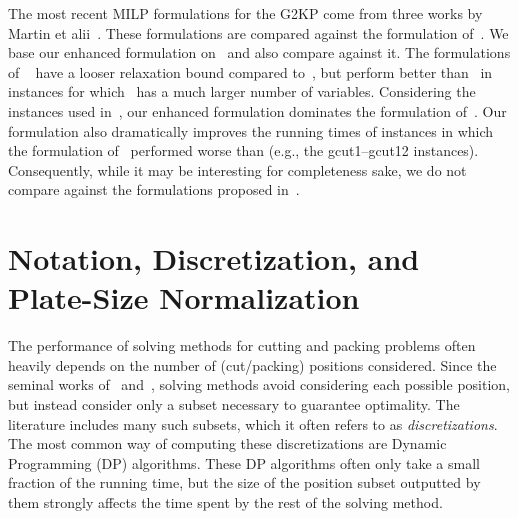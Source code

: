 \documentclass[smallextended]{svjour3}       %
\begin{document}
The most recent MILP formulations for the G2KP come from three works by Martin et alii~\cite{martin:2020:models,martin:2020:bottom,martin:2020:top}.
These formulations are compared against the formulation of~\cite{furini:2016}.
We base our enhanced formulation on~\cite{furini:2016} and also compare against it.
The formulations of ~\cite{martin:2020:models,martin:2020:bottom,martin:2020:top}
have a looser relaxation bound compared to~\cite{furini:2016}, but perform better than~\cite{furini:2016} in instances for which~\cite{furini:2016} has a much larger number of variables.
Considering the instances used in~\cite{furini:2016}, our enhanced formulation dominates the formulation of~\cite{furini:2016}.
Our formulation also dramatically improves the running times of instances in which the formulation of~\cite{furini:2016} performed worse than \cite{martin:2020:models,martin:2020:bottom,martin:2020:top} (e.g., the gcut1--gcut12 instances).
Consequently, while it may be interesting for completeness sake, we do not compare against the formulations proposed in~\cite{martin:2020:models,martin:2020:bottom,martin:2020:top}.


\section{Notation, Discretization, and Plate-Size Normalization}
\label{sec:psn}

The performance of solving methods for cutting and packing problems often heavily depends on the number of (cut/packing) positions considered.
Since the seminal works of~\cite{cw:1977} and~\cite{herz:1972}, solving methods avoid considering each possible position, but instead consider only a subset necessary to guarantee optimality.
The literature includes many such subsets, which it often refers to as \emph{discretizations}.
The most common way of computing these discretizations are Dynamic Programming (DP) algorithms.
These DP algorithms often only take a small fraction of the running time, but the size of the position subset outputted by them strongly affects the time spent by the rest of the solving method.
\end{document}
